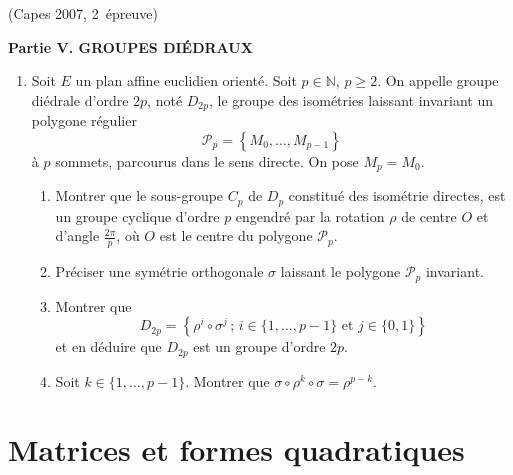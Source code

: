 \documentclass[a4paper,12pt,reqno]{amsart}
\begin{document}
\begin{exo} (Capes 2007, 2\ieme\ épreuve)

\begin{center}
  \textbf{Partie V. GROUPES DIÉDRAUX}
\end{center}

\begin{enumerate}
  \renewcommand{\theenumi}{\arabic{enumi}}
  \renewcommand{\labelenumi}{\bf\theenumi.}
  \renewcommand{\theenumii}{\alph{enumii}}
  \renewcommand{\labelenumii}{\theenumii)}

  \item Soit $E$ un plan affine euclidien orienté. Soit $p \in \mathbb{N}$, $p \geq 2$. On appelle groupe diédrale d'ordre $2p$, noté $D_{2p}$, le groupe des isométries laissant invariant un polygone régulier
  \[
    \mathcal{P}_{p}=\left\{M_{0},\ldots,M_{p-1}\right\}
  \]
  à $p$ sommets, parcourus dans le sens directe. On pose $M_{p}=M_{0}$.
  \begin{enumerate}
    \item Montrer que le sous-groupe $C_{p}$ de $D_{p}$ constitué des isométrie directes, est un groupe cyclique d'ordre $p$ engendré par la rotation $\rho$ de centre $O$ et d'angle $\frac{2 \pi}{p}$, où $O$ est le centre du polygone $\mathcal{P}_{p}$.

    \item Préciser une symétrie orthogonale $\sigma$ laissant le polygone $\mathcal{P}_{p}$ invariant.

    \item Montrer que
    \[
      D_{2p} = \left\{
        \rho^{i}\circ \sigma^{j} \,;\, i \in \{1,\ldots,p-1\} \text{ et } j \in \{0,1\}
      \right\}
    \]
    et en déduire que $D_{2p}$ est un groupe d'ordre $2p$.

    \item Soit $k \in \{1,\ldots,p-1\}$. Montrer que $\sigma \circ \rho^{k} \circ \sigma = \rho^{p-k}$.
  \end{enumerate}
\end{enumerate}

\end{exo}

\section{Matrices et formes quadratiques}
\end{document}
